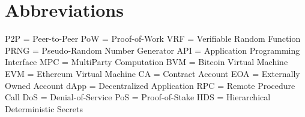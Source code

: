 \chapter*{Abbreviations}

P2P = Peer-to-Peer \newline %
PoW = Proof-of-Work \newline %
VRF = Verifiable Random Function \newline %
PRNG = Pseudo-Random Number Generator \newline %
API = Application Programming Interface \newline %
MPC = MultiParty Computation \newline %
BVM = Bitcoin Virtual Machine \newline %
EVM = Ethereum Virtual Machine \newline %
CA = Contract Account \newline %
EOA = Externally Owned Account \newline %
dApp = Decentralized Application \newline %
RPC = Remote Procedure Call \newline %
DoS = Denial-of-Service \newline %
PoS = Proof-of-Stake \newline
HDS = Hierarchical Deterministic Secrets \newline
